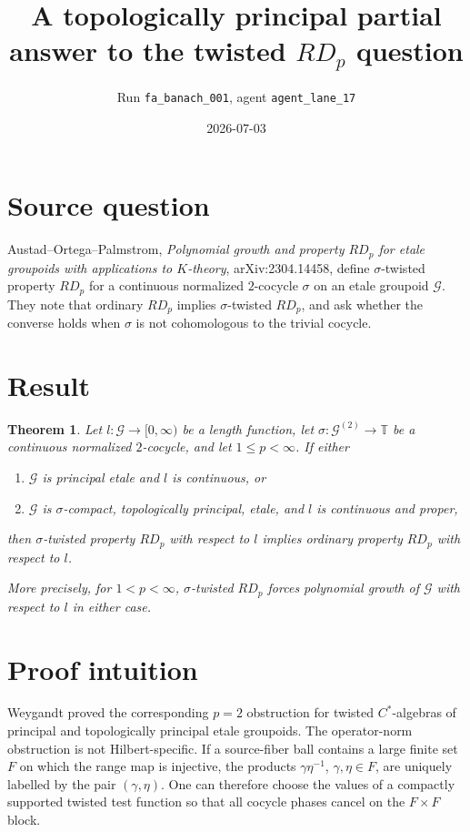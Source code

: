 \documentclass[11pt]{article}
\title{A topologically principal partial answer to the twisted \(RD_p\) question}
\author{Run \texttt{fa\_banach\_001}, agent \texttt{agent\_lane\_17}}
\date{2026-07-03}
\newtheorem{theorem}{Theorem}
\newcommand{\G}{\mathcal G}
\newcommand{\T}{\mathbb T}
\begin{document}
\maketitle

\section*{Source question}

Austad--Ortega--Palmstrom, \emph{Polynomial growth and property \(RD_p\) for
etale groupoids with applications to \(K\)-theory}, arXiv:2304.14458, define
\(\sigma\)-twisted property \(RD_p\) for a continuous normalized
\(2\)-cocycle \(\sigma\) on an etale groupoid \(\G\).  They note that ordinary
\(RD_p\) implies \(\sigma\)-twisted \(RD_p\), and ask whether the converse holds
when \(\sigma\) is not cohomologous to the trivial cocycle.

\section*{Result}

\begin{theorem}
Let \(l:\G\to [0,\infty)\) be a length function, let
\(\sigma:\G^{(2)}\to\T\) be a continuous normalized \(2\)-cocycle, and let
\(1\le p<\infty\).  If either
\begin{enumerate}
\item \(\G\) is principal etale and \(l\) is continuous, or
\item \(\G\) is \(\sigma\)-compact, topologically principal, etale, and \(l\)
is continuous and proper,
\end{enumerate}
then \(\sigma\)-twisted property \(RD_p\) with respect to \(l\) implies ordinary
property \(RD_p\) with respect to \(l\).

More precisely, for \(1<p<\infty\), \(\sigma\)-twisted \(RD_p\) forces
polynomial growth of \(\G\) with respect to \(l\) in either case.
\end{theorem}

\section*{Proof intuition}

Weygandt proved the corresponding \(p=2\) obstruction for twisted
\(C^*\)-algebras of principal and topologically principal etale groupoids.  The
operator-norm obstruction is not Hilbert-specific.  If a source-fiber ball
contains a large finite set \(F\) on which the range map is injective, the
products \(\gamma\eta^{-1}\), \(\gamma,\eta\in F\), are uniquely labelled by the
pair \((\gamma,\eta)\).  One can therefore choose the values of a compactly
supported twisted test function so that all cocycle phases cancel on the
\(F\times F\) block.
\end{document}
